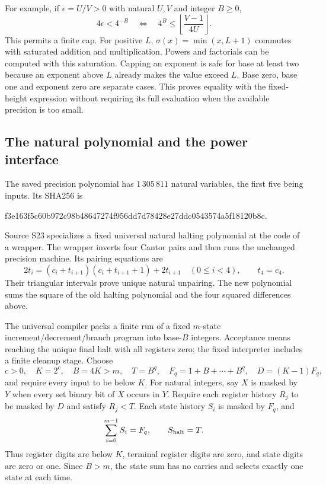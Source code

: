 \documentclass[11pt]{article}
\theoremstyle{definition}
\theoremstyle{remark}
\begin{document}
For example, if $\epsilon=U/V>0$ with natural $U,V$ and integer $B\ge0$,
\[
 4\epsilon<4^{-B}\quad\Longleftrightarrow\quad
 4^B\le\left\lfloor\frac{V-1}{4U}\right\rfloor.
\]
This permits a finite cap. For positive $L$, $\sigma(x)=\min(x,L+1)$
commutes with saturated addition and multiplication. Powers and factorials
can be computed with this saturation. Capping an exponent is safe for
base at least two because an exponent above $L$ already makes the value
exceed $L$. Base zero, base one and exponent zero are separate cases.
This proves equality with the fixed-height expression without requiring
its full evaluation when the available precision is too small.

\subsection{The natural polynomial and the power interface}
The saved precision polynomial has $1\,305\,811$ natural variables,
the first five being inputs. Its SHA256 is
\begin{center}\small\ttfamily
f3e163f5c60b972c98b48647274f956dd7d78428e27ddc0543574a5f18120b8c.
\end{center}
Source S23 specializes a fixed universal natural halting polynomial at
the code of a wrapper. The wrapper inverts four Cantor pairs and then
runs the unchanged precision machine. Its pairing equations are
\[
 2t_i=(c_i+t_{i+1})(c_i+t_{i+1}+1)+2t_{i+1}\quad(0\le i<4),
 \qquad t_4=c_4.
\]
Their triangular intervals prove unique natural unpairing. The new
polynomial sums the square of the old halting polynomial and the four
squared differences above.

The universal compiler packs a finite run of a fixed $m$-state
increment/decrement/branch program into base-$B$ integers. Acceptance
means reaching the unique final halt with all registers zero; the fixed
interpreter includes a finite cleanup stage. Choose
\[
 c>0,\quad K=2^c,\quad B=4K>m,\quad T=B^q,\quad
 F_q=1+B+\cdots+B^q,\quad D=(K-1)F_q,
\]
and require every input to be below $K$. For natural integers, say
$X$ is masked by $Y$ when every set binary bit of $X$ occurs in $Y$.
Require each register history $R_j$ to be masked by $D$ and satisfy
$R_j<T$. Each state history $S_i$ is masked by $F_q$, and
\[
 \sum_{i=0}^{m-1}S_i=F_q,\qquad S_{\rm halt}=T.
\]
Thus register digits are below $K$, terminal register digits are zero,
and state digits are zero or one. Since $B>m$, the state sum has no
carries and selects exactly one state at each time.
\end{document}
